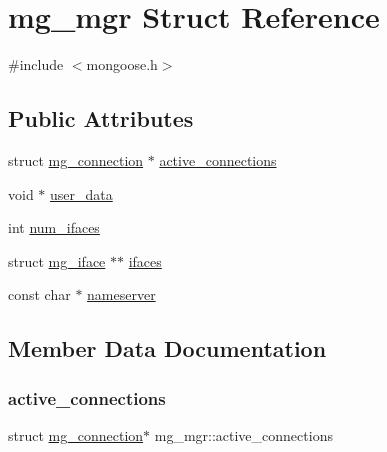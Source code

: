 \hypertarget{structmg__mgr}{}\section{mg\+\_\+mgr Struct Reference}
\label{structmg__mgr}


{\ttfamily \#include $<$mongoose.\+h$>$}

\subsection*{Public Attributes}
\begin{DoxyCompactItemize}
\item 
struct \hyperlink{structmg__connection}{mg\+\_\+connection} $\ast$ \hyperlink{structmg__mgr_abb2e9f2e7a4851f22e84da9f87d9cca2_abb2e9f2e7a4851f22e84da9f87d9cca2}{active\+\_\+connections}
\item 
void $\ast$ \hyperlink{structmg__mgr_ac2e8ed98ad341f9f58bfd3add2c6bdc6_ac2e8ed98ad341f9f58bfd3add2c6bdc6}{user\+\_\+data}
\item 
int \hyperlink{structmg__mgr_a5354db212e2db2b8e115017ecf1060df_a5354db212e2db2b8e115017ecf1060df}{num\+\_\+ifaces}
\item 
struct \hyperlink{structmg__iface}{mg\+\_\+iface} $\ast$$\ast$ \hyperlink{structmg__mgr_afd2b46e44b87ffc58a8e286ed784ee31_afd2b46e44b87ffc58a8e286ed784ee31}{ifaces}
\item 
const char $\ast$ \hyperlink{structmg__mgr_a6177e6c1145fe43e36d7cc926a7f0d8c_a6177e6c1145fe43e36d7cc926a7f0d8c}{nameserver}
\end{DoxyCompactItemize}


\subsection{Member Data Documentation}
\mbox{\label{structmg__mgr_abb2e9f2e7a4851f22e84da9f87d9cca2_abb2e9f2e7a4851f22e84da9f87d9cca2}} 
\subsubsection{\texorpdfstring{active\+\_\+connections}{active\_connections}}
{\footnotesize\ttfamily struct \hyperlink{structmg__connection}{mg\+\_\+connection}$\ast$ mg\+\_\+mgr\+::active\+\_\+connections}



